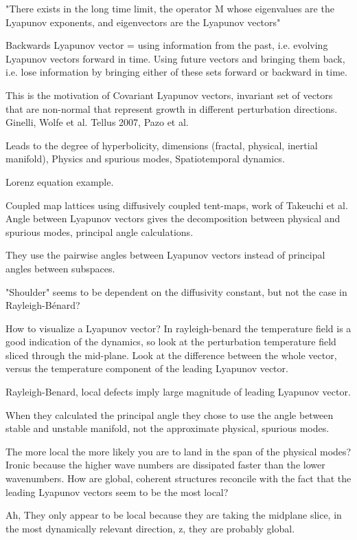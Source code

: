 \begin{description}
{\begin{description}
"There exists in the long time limit, the operator M whose eigenvalues are the Lyapunov exponents,
and eigenvectors are the Lyapunov vectors"

Backwards Lyapunov vector = using information from the past, i.e. evolving Lyapunov vectors forward
in time. Using future vectors and bringing them back, i.e. lose information by bringing either
of these sets forward or backward in time.

This is the motivation of Covariant Lyapunov vectors, invariant set of vectors that are non-normal
that represent growth in different perturbation directions.
Ginelli, Wolfe et al. Tellus 2007, Pazo et al.

Leads to the degree of hyperbolicity, dimensions (fractal, physical, inertial manifold),
Physics and spurious modes, Spatiotemporal dynamics.

Lorenz equation example.

Coupled map lattices using diffusively coupled tent-maps, work of Takeuchi et al.
Angle between Lyapunov vectors gives the decomposition between physical and spurious
modes, principal angle calculations.

They use the pairwise angles between Lyapunov vectors instead of principal angles
between subspaces.

"Shoulder" seems to be dependent on the diffusivity constant, but not the case in Rayleigh-B\'enard?

How to visualize a Lyapunov vector?
In rayleigh-benard the temperature field is a good indication of the dynamics, so look at the perturbation
temperature field sliced through the mid-plane. Look at the difference between the whole vector, versus
the temperature component of the leading Lyapunov vector.

Rayleigh-Benard, local defects imply large magnitude of leading Lyapunov vector.

When they calculated the principal angle they chose to use the angle between stable and unstable manifold,
not the approximate physical, spurious modes.

The more local the more likely you are to land in the span of the physical modes? Ironic because the
higher wave numbers are dissipated faster than the lower wavenumbers. How are global, coherent structures
reconcile with the fact that the leading Lyapunov vectors seem to be the most local?

Ah, They only appear to be local because they are taking the midplane slice, in the most dynamically
relevant direction, z, they are probably global.


\end{description}}
\end{description}
